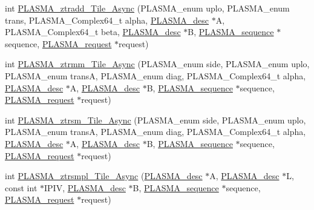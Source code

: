 \begin{DoxyCompactItemize}
\item 
int \hyperlink{group__PLASMA__Complex64__t__Tile__Async_gafc36e43539e5dca2fb811c2c7c5a9e55_gafc36e43539e5dca2fb811c2c7c5a9e55}{P\+L\+A\+S\+M\+A\+\_\+ztradd\+\_\+\+Tile\+\_\+\+Async} (P\+L\+A\+S\+M\+A\+\_\+enum uplo, P\+L\+A\+S\+M\+A\+\_\+enum trans, P\+L\+A\+S\+M\+A\+\_\+\+Complex64\+\_\+t alpha, \hyperlink{structplasma__desc__t}{P\+L\+A\+S\+M\+A\+\_\+desc} $\ast$A, P\+L\+A\+S\+M\+A\+\_\+\+Complex64\+\_\+t beta, \hyperlink{structplasma__desc__t}{P\+L\+A\+S\+M\+A\+\_\+desc} $\ast$B, \hyperlink{structplasma__sequence__t}{P\+L\+A\+S\+M\+A\+\_\+sequence} $\ast$sequence, \hyperlink{structplasma__request__t}{P\+L\+A\+S\+M\+A\+\_\+request} $\ast$request)
\item 
int \hyperlink{group__PLASMA__Complex64__t__Tile__Async_ga6fe9ba44646a8e7bc93a7a2cd20bf862_ga6fe9ba44646a8e7bc93a7a2cd20bf862}{P\+L\+A\+S\+M\+A\+\_\+ztrmm\+\_\+\+Tile\+\_\+\+Async} (P\+L\+A\+S\+M\+A\+\_\+enum side, P\+L\+A\+S\+M\+A\+\_\+enum uplo, P\+L\+A\+S\+M\+A\+\_\+enum trans\+A, P\+L\+A\+S\+M\+A\+\_\+enum diag, P\+L\+A\+S\+M\+A\+\_\+\+Complex64\+\_\+t alpha, \hyperlink{structplasma__desc__t}{P\+L\+A\+S\+M\+A\+\_\+desc} $\ast$A, \hyperlink{structplasma__desc__t}{P\+L\+A\+S\+M\+A\+\_\+desc} $\ast$B, \hyperlink{structplasma__sequence__t}{P\+L\+A\+S\+M\+A\+\_\+sequence} $\ast$sequence, \hyperlink{structplasma__request__t}{P\+L\+A\+S\+M\+A\+\_\+request} $\ast$request)
\item 
int \hyperlink{group__PLASMA__Complex64__t__Tile__Async_gaaa1f664d00ac743bd6f9dd0c116e72a5_gaaa1f664d00ac743bd6f9dd0c116e72a5}{P\+L\+A\+S\+M\+A\+\_\+ztrsm\+\_\+\+Tile\+\_\+\+Async} (P\+L\+A\+S\+M\+A\+\_\+enum side, P\+L\+A\+S\+M\+A\+\_\+enum uplo, P\+L\+A\+S\+M\+A\+\_\+enum trans\+A, P\+L\+A\+S\+M\+A\+\_\+enum diag, P\+L\+A\+S\+M\+A\+\_\+\+Complex64\+\_\+t alpha, \hyperlink{structplasma__desc__t}{P\+L\+A\+S\+M\+A\+\_\+desc} $\ast$A, \hyperlink{structplasma__desc__t}{P\+L\+A\+S\+M\+A\+\_\+desc} $\ast$B, \hyperlink{structplasma__sequence__t}{P\+L\+A\+S\+M\+A\+\_\+sequence} $\ast$sequence, \hyperlink{structplasma__request__t}{P\+L\+A\+S\+M\+A\+\_\+request} $\ast$request)
\item 
int \hyperlink{group__PLASMA__Complex64__t__Tile__Async_ga571f9103814a1dd4995a6094a293ef97_ga571f9103814a1dd4995a6094a293ef97}{P\+L\+A\+S\+M\+A\+\_\+ztrsmpl\+\_\+\+Tile\+\_\+\+Async} (\hyperlink{structplasma__desc__t}{P\+L\+A\+S\+M\+A\+\_\+desc} $\ast$A, \hyperlink{structplasma__desc__t}{P\+L\+A\+S\+M\+A\+\_\+desc} $\ast$L, const int $\ast$I\+P\+I\+V, \hyperlink{structplasma__desc__t}{P\+L\+A\+S\+M\+A\+\_\+desc} $\ast$B, \hyperlink{structplasma__sequence__t}{P\+L\+A\+S\+M\+A\+\_\+sequence} $\ast$sequence, \hyperlink{structplasma__request__t}{P\+L\+A\+S\+M\+A\+\_\+request} $\ast$request)

\end{DoxyCompactItemize}
